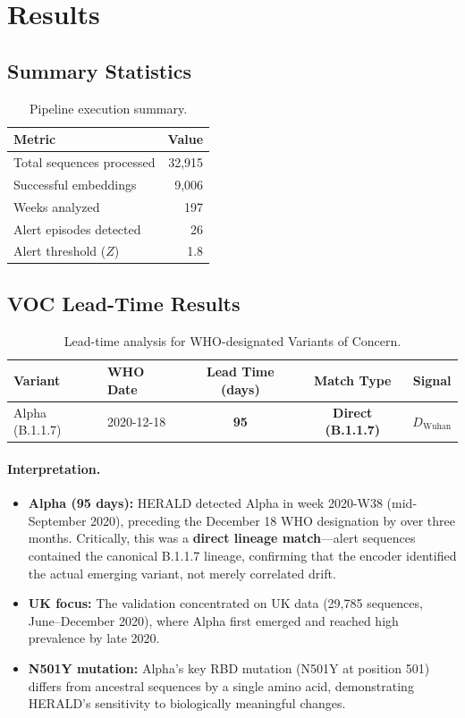 \documentclass[11pt]{article}
\begin{document}
\section{Results}
\subsection{Summary Statistics}
\begin{table}[H]
\centering
\caption{Pipeline execution summary.}
\label{tab:summary}
\begin{tabular}{lr}
\toprule
\textbf{Metric} & \textbf{Value} \\
\midrule
Total sequences processed & 32,915 \\
Successful embeddings & 9,006 \\
Weeks analyzed & 197 \\
Alert episodes detected & 26 \\
Alert threshold ($Z$) & 1.8 \\
\bottomrule
\end{tabular}
\end{table}

\subsection{VOC Lead-Time Results}
\begin{table}[H]
\centering
\caption{Lead-time analysis for WHO-designated Variants of Concern.}
\label{tab:leadtime}
\begin{tabular}{llccc}
\toprule
\textbf{Variant} & \textbf{WHO Date} & \textbf{Lead Time (days)} & \textbf{Match Type} & \textbf{Signal} \\
\midrule
Alpha (B.1.1.7) & 2020-12-18 & \textbf{95} & \textbf{Direct (B.1.1.7)} & $D_{\text{Wuhan}}$ \\
\bottomrule
\end{tabular}
\end{table}

\paragraph{Interpretation.}
\begin{itemize}[leftmargin=1.1em]
  \item \textbf{Alpha (95 days):} HERALD detected Alpha in week 2020-W38 (mid-September 2020), preceding the December 18 WHO designation by over three months. Critically, this was a \textbf{direct lineage match}---alert sequences contained the canonical B.1.1.7 lineage, confirming that the encoder identified the actual emerging variant, not merely correlated drift.
  \item \textbf{UK focus:} The validation concentrated on UK data (29,785 sequences, June--December 2020), where Alpha first emerged and reached high prevalence by late 2020.
  \item \textbf{N501Y mutation:} Alpha's key RBD mutation (N501Y at position 501) differs from ancestral sequences by a single amino acid, demonstrating HERALD's sensitivity to biologically meaningful changes.
\end{itemize}
\end{document}
